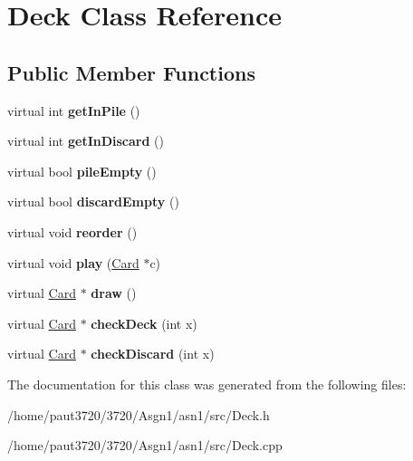 \hypertarget{class_deck}{\section{Deck Class Reference}
\label{class_deck}
}
\subsection*{Public Member Functions}
\begin{DoxyCompactItemize}
\item 
\hypertarget{class_deck_a6147e03131362a92c53c2e155a045e04}{virtual int {\bfseries get\-In\-Pile} ()}\label{class_deck_a6147e03131362a92c53c2e155a045e04}

\item 
\hypertarget{class_deck_a8c438ab14ab52fdff711f87ba31b63f9}{virtual int {\bfseries get\-In\-Discard} ()}\label{class_deck_a8c438ab14ab52fdff711f87ba31b63f9}

\item 
\hypertarget{class_deck_a0573567fde3add7ca765aac9ccfd84ea}{virtual bool {\bfseries pile\-Empty} ()}\label{class_deck_a0573567fde3add7ca765aac9ccfd84ea}

\item 
\hypertarget{class_deck_ab669893b79f22268353bdc37b61cea9b}{virtual bool {\bfseries discard\-Empty} ()}\label{class_deck_ab669893b79f22268353bdc37b61cea9b}

\item 
\hypertarget{class_deck_ad261348614fc0e0e100fdfe844705f9f}{virtual void {\bfseries reorder} ()}\label{class_deck_ad261348614fc0e0e100fdfe844705f9f}

\item 
\hypertarget{class_deck_a2237078662577ba00e35ccb681083053}{virtual void {\bfseries play} (\hyperlink{class_card}{Card} $\ast$c)}\label{class_deck_a2237078662577ba00e35ccb681083053}

\item 
\hypertarget{class_deck_a2463432e03dc0196cc734a8041e9429c}{virtual \hyperlink{class_card}{Card} $\ast$ {\bfseries draw} ()}\label{class_deck_a2463432e03dc0196cc734a8041e9429c}

\item 
\hypertarget{class_deck_a5fc49ebe82bb7016663bd25d4dc96291}{virtual \hyperlink{class_card}{Card} $\ast$ {\bfseries check\-Deck} (int x)}\label{class_deck_a5fc49ebe82bb7016663bd25d4dc96291}

\item 
\hypertarget{class_deck_a175de3e0e54c3e33ef527707662d45bd}{virtual \hyperlink{class_card}{Card} $\ast$ {\bfseries check\-Discard} (int x)}\label{class_deck_a175de3e0e54c3e33ef527707662d45bd}

\end{DoxyCompactItemize}


The documentation for this class was generated from the following files\-:\begin{DoxyCompactItemize}
\item 
/home/paut3720/3720/\-Asgn1/asn1/src/Deck.\-h\item 
/home/paut3720/3720/\-Asgn1/asn1/src/Deck.\-cpp\end{DoxyCompactItemize}
